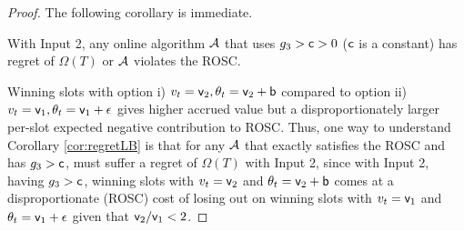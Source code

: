 \begin{proof}
The following corollary is immediate.
\begin{corollary}\label{cor:regretLB}
 With Input 2, any online algorithm $\mathcal{A}$ that uses $g_3>{\mathsf{c}}>0$ (${\mathsf{c}}$ is a constant) has regret of $\Omega(T)$ or $\mathcal{A}$ violates the ROSC.
\end{corollary}
Winning slots with option i) $v_t={\mathsf{v}}_2, \theta_t={\mathsf{v}}_2+{\mathsf{b}}$ compared to option ii) $v_t={\mathsf{v}}_1,\theta_t={\mathsf{v}}_1+\epsilon$ gives higher accrued value but a disproportionately larger per-slot expected negative contribution to ROSC.
Thus, one way to understand Corollary \ref{cor:regretLB} is that for any $\mathcal{A}$ that exactly satisfies the  ROSC and has $g_3>{\mathsf{c}}$, must suffer a regret of $\Omega(T)$ with Input 2, since 
 with Input 2, having  $g_3>{\mathsf{c}}$, winning slots with $v_t={\mathsf{v}}_2$ and $\theta_t={\mathsf{v}}_2+{\mathsf{b}}$ comes at a disproportionate (ROSC) cost of losing out on winning slots with $v_t={\mathsf{v}}_1$ and $\theta_t={\mathsf{v}}_1+\epsilon$ given that ${\mathsf{v}}_2/{\mathsf{v}}_1<2$.
% 
%
%
%
%
%
%
%
%
%
%
%
%
% 


\end{proof}
